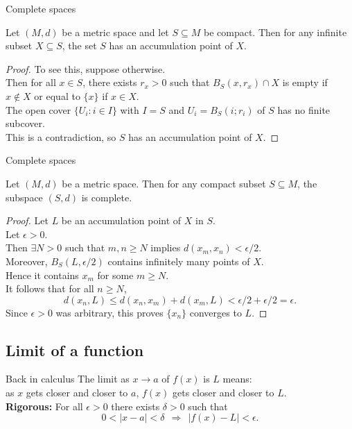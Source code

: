 \documentclass{beamer}
\begin{document}
\begin{frame}{Complete spaces}
\begin{lem}
Let $(M,d)$ be a metric space and let $S\subseteq M$ be compact.
\pause
Then for any infinite subset $X\subseteq S$, the set $S$ has an accumulation point of $X$.
\end{lem}
\pause
\begin{proof}
\pause
To see this, suppose otherwise.\\
\pause
Then for all $x\in S$, there exists $r_x > 0$ such that $B_S(x,r_x)\cap X$ is empty if $x\notin X$ or equal to $\{x\}$ if $x\in X$.\\
\pause
The open cover $\{U_i: i\in I\}$ with $I=S$ and $U_i = B_S(i; r_i)$ of $S$ has no finite subcover.\\
\pause
This is a contradiction, so $S$ has an accumulation point of $X$.
\end{proof}
\end{frame}

\begin{frame}{Complete spaces}
\begin{thm}
Let $(M,d)$ be a metric space.
Then for any compact subset $S\subseteq M$, the subspace $(S,d)$ is complete.
\end{thm}
\begin{proof}
\pause
Let $L$ be an accumulation point of $X$ in $S$.\\
\pause
Let $\epsilon > 0$.\\
\pause
Then $\exists N>0$ such that $m,n \geq N$ implies $d(x_m,x_n) < \epsilon/2$.\\
\pause
Moreover, $B_S(L,\epsilon/2)$ contains infinitely many points of $X$.\\
\pause
Hence it contains $x_m$ for some $m\geq N$.\\
\pause
It follows that for all $n\geq N$,
$$d(x_n,L)\leq d(x_n,x_m) + d(x_m,L) < \epsilon/2 + \epsilon/2 = \epsilon.$$
\pause
Since $\epsilon > 0$ was arbitrary, this proves $\{x_n\}$ converges to $L$.
\end{proof}
\end{frame}

\subsection{Limit of a function}

\begin{frame}{Back in calculus}
The limit as $x\rightarrow a$ of $f(x)$ is $L$ means:\\
\pause
as $x$ gets closer and closer to $a$, 
\pause
$f(x)$ gets closer and closer to $L$.\\
\pause
\textbf{Rigorous:}
For all $\epsilon > 0$ there exists $\delta > 0$ such that
$$0 < |x-a| < \delta\ \ \Rightarrow\ \ |f(x)-L| < \epsilon.$$
\end{frame}
\end{document}
